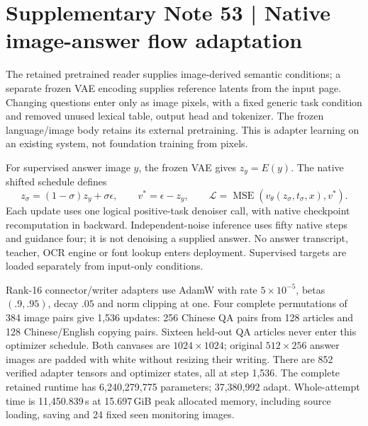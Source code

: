 \documentclass[10pt,a4paper]{article}
\begin{document}
\clearpage
{}

\clearpage
\section*{Supplementary Note 53 | Native image-answer flow adaptation}
\label{note:native-visual-flow}
The retained pretrained reader supplies image-derived semantic conditions;
a separate frozen VAE encoding supplies reference latents from the input page.
Changing questions enter only as image pixels, with a fixed generic task
condition and removed unused lexical table, output head and tokenizer.
The frozen language/image body retains its external pretraining. This is
adapter learning on an existing system, not foundation training from pixels.

For supervised answer image $y$, the frozen VAE gives $z_y=E(y)$.
The native shifted schedule defines
\[
z_\sigma=(1-\sigma)z_y+\sigma\epsilon,\qquad
v^*=\epsilon-z_y,\qquad
\mathcal L=\operatorname{MSE}(v_\theta(z_\sigma,t_\sigma,x),v^*).
\]
Each update uses one logical positive-task denoiser call, with native
checkpoint recomputation in backward. Independent-noise inference uses
fifty native steps and guidance four; it is not denoising a supplied answer.
No answer transcript, teacher, OCR engine or font lookup enters deployment.
Supervised targets are loaded separately from input-only conditions.

Rank-16 connector/writer adapters use AdamW with rate $5\times10^{-5}$,
betas $(.9,.95)$, decay $.05$ and norm clipping at one. Four complete
permutations of 384 image pairs give 1,536 updates: 256 Chinese QA pairs from 128
articles and 128 Chinese/English copying pairs. Sixteen held-out QA articles
never enter this optimizer schedule. Both canvases are $1024\times1024$; original
$512\times256$ answer images are padded with white without resizing their writing.
There are 852 verified adapter tensors and optimizer states, all at step 1,536.
The complete retained runtime has 6,240,279,775 parameters; 37,380,992 adapt.
Whole-attempt time is 11,450.839\,s at 15.697\,GiB peak allocated memory,
including source loading, saving and 24 fixed seen monitoring images.
\end{document}
